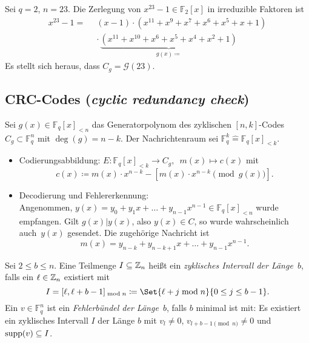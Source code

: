 \documentclass{cheat-sheet}
\newcommand{\F}{\mathbb{F}} %
\newcommand{\divides}{|} %
\newcommand{\Golay}{\mathcal{G}} %
\begin{document}
\begin{bsp}
  Sei $q = 2$, $n = 23$.
  Die Zerlegung von $x^{23} - 1 \in \F_2[x]$ in irreduzible Faktoren ist
  \begin{align*}
    x^{23} - 1 = \enspace & (x-1) \cdot (x^{11} + x^9 + x^7 + x^6 + x^5 + x + 1) \\
    & \cdot \, \underbrace{(x^{11} + x^{10} + x^6 + x^5 + x^4 + x^2 + 1)}_{g(x) \coloneqq}
  \end{align*}
  Es stellt sich heraus, dass $C_g = \Golay(23)$.
\end{bsp}

\subsection{CRC-Codes (\textit{cyclic redundancy check})}

\begin{verf}
  Sei $g(x) \in \F_q[x]_{< n}$ das Generatorpolynom des zyklischen $[n, k]$-Codes $C_g \subset \F_q^n$ mit $\deg(g) = n - k$.
  Der Nachrichtenraum sei $\F_q^k \hat{=} \F_q[x]_{< k}$.
  \begin{itemize}
    \item Codierungsabbildung: \enspace $E : \F_q[x]_{< k} \to C_g, \enspace m(x) \mapsto c(x)$ \enspace mit
    \[
      c(x) \coloneqq m(x) \cdot x^{n-k} - [ m(x) \cdot x^{n-k} \pmod{g(x)} ].
    \]
    \item Decodierung und Fehlererkennung: \\
    Angenommen, $y(x) = y_0 + y_1 x + \ldots + y_{n-1} x^{n-1} \in \F_q[x]_{< n}$ wurde empfangen.
    Gilt $g(x) \divides y(x)$, also $y(x) \in C$, so wurde wahrscheinlich auch~$y(x)$ gesendet.
    Die zugehörige Nachricht ist
    \[
      m(x) = y_{n-k} + y_{n-k+1} x + \ldots + y_{n-1} x^{n-1}.
    \]
  \end{itemize}
\end{verf}

\begin{defn}
  Sei $2 \leq b \leq n$.
  Eine Teilmenge $I \subseteq \mathbb{Z}_n$ heißt ein \emph{zyklisches Intervall der Länge~$b$}, falls ein $\ell \in \mathbb{Z}_n$ existiert mit
  \[
    I = [\ell, \ell + b - 1]_{\bmod n} \coloneqq \Set{\ell + j \bmod n}{0 \leq j \leq b-1}.
  \]
  Ein $v \in \F_q^n$ ist ein \emph{Fehlerbündel der Länge~$b$}, falls $b$ minimal ist mit:
  Es existiert ein zyklisches Intervall $I$ der Länge $b$ mit $v_l \neq 0$, $v_{l+b-1 \pmod{n}} \neq 0$ und $\operatorname{supp}(v) \subseteq I$.
\end{defn}
\end{document}
